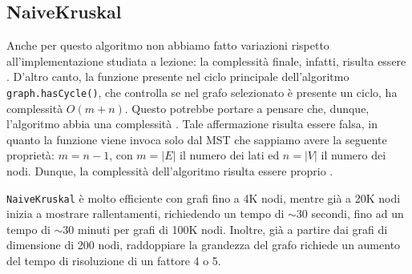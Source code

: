 \subsection{NaiveKruskal}
Anche per questo algoritmo non abbiamo fatto variazioni rispetto all'implementazione studiata a lezione: la complessità finale, infatti, risulta essere . D'altro canto, la funzione presente nel ciclo principale dell'algoritmo \texttt{graph.hasCycle()}, che controlla se nel grafo selezionato è presente un ciclo, ha complessità $O(m+n)$. Questo potrebbe portare a pensare che, dunque, l'algoritmo abbia una complessità . Tale affermazione risulta essere falsa, in quanto la funzione viene invoca solo dal MST che sappiamo avere la seguente proprietà: $m=n-1$, con $m = |E|$ il numero dei lati ed $n = |V|$ il numero dei nodi. Dunque, la complessità dell'algoritmo risulta essere proprio .


\texttt{NaiveKruskal} è molto efficiente con grafi fino a 4K nodi, mentre già a 20K nodi inizia a mostrare rallentamenti, richiedendo un tempo di $\sim$30 secondi, fino ad un tempo di $\sim$30 minuti per grafi di 100K nodi.
Inoltre, già a partire dai grafi di dimensione di 200 nodi, raddoppiare la grandezza del grafo richiede un aumento del tempo di risoluzione di un fattore 4 o 5.

